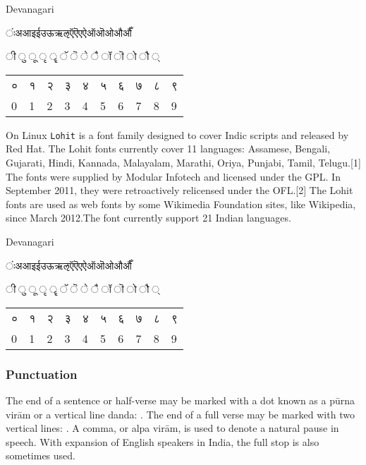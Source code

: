 \begin{scriptexample}[]{Devanagari}
{\begin{center}\parindent0pt\devanagari

ंःअआइईउऊऋऌऍऎएऐऑऒओऔऔँ \par 

ी	ु	ू	ृ	ॄ	ॅ	ॆ	े	ै	ॉ	ॊ	ो	ौ	्	\par

\bigskip		
\begin{tabular}{lll lll lll l}
०	&१	&२	&३	&४	&५	&६	&७	&८	&९\\
0	&1	&2	&3	&4	&5	&6	&7	&8	&9\\
\end{tabular}
\end{center}	
}
\end{scriptexample}


On Linux \texttt{Lohit} is a font family designed to cover Indic scripts and released by Red Hat. The Lohit fonts currently cover 11 languages: Assamese, Bengali, Gujarati, Hindi, Kannada, Malayalam, Marathi, Oriya, Punjabi, Tamil, Telugu.[1] The fonts were supplied by Modular Infotech and licensed under the GPL. In September 2011, they were retroactively relicensed under the OFL.[2] The Lohit fonts are used as web fonts by some Wikimedia Foundation sites, like Wikipedia, since March 2012.The font currently support 21 Indian languages. 

\let\devanagarilohit\pan

\begin{scriptexample}[]{Devanagari}
\begin{center}\parindent0pt\devanagarilohit

ंःअआइईउऊऋऌऍऎएऐऑऒओऔऔँ \par 

ी	ु	ू	ृ	ॄ	ॅ	ॆ	े	ै	ॉ	ॊ	ो	ौ	्	\par

\bigskip		
\begin{tabular}{lll lll lll l}
०	&१	&२	&३	&४	&५	&६	&७	&८	&९\\
0	&1	&2	&3	&4	&5	&6	&7	&8	&9\\
\end{tabular}
\end{center}
\end{scriptexample}

\subsubsection{Punctuation} 
The end of a sentence or half-verse may be marked with a dot known as a pūrna virām or a vertical line danda: \textbar. The end of a full verse may be marked with two vertical lines: \textbar\textbar. A comma, or alpa virām, is used to denote a natural pause in speech. With expansion of English speakers in India, the full stop is also sometimes used.

